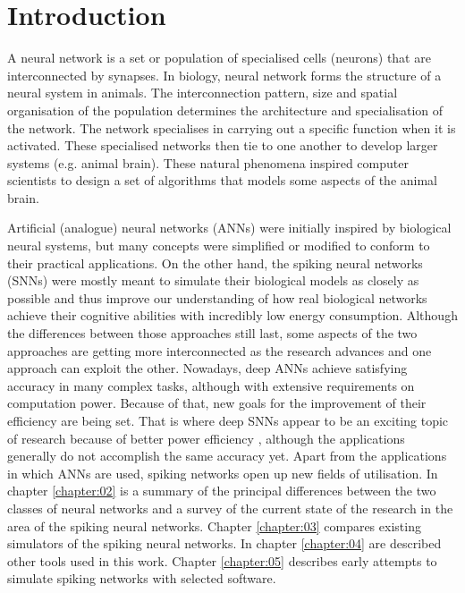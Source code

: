 \chapter{Introduction} \label{chapter:01}

A neural network is a set or population of specialised cells (neurons) that are interconnected by synapses. In biology, neural network forms the structure of a neural system in animals. The interconnection pattern, size and spatial organisation of the population determines the architecture and specialisation of the network. The network specialises in carrying out a specific function when it is activated. These specialised networks then tie to one another to develop larger systems (e.g. animal brain). These natural phenomena inspired computer scientists to design a set of algorithms that models some aspects of the animal brain. 

Artificial (analogue) neural networks (ANNs) were initially inspired by biological neural systems, but many concepts were simplified or modified to conform to their practical applications. On the other hand, the spiking neural networks (SNNs) were mostly meant to simulate their biological models as closely as possible and thus improve our understanding of how real biological networks achieve their cognitive abilities with incredibly low energy consumption. Although the differences between those approaches still last, some aspects of the two approaches are getting more interconnected as the research advances and one approach can exploit the other. Nowadays, deep ANNs achieve satisfying accuracy in many complex tasks, although with extensive requirements on computation power. Because of that, new goals for the improvement of their efficiency are being set. That is where deep SNNs appear to be an exciting topic of research because of better power efficiency \cite{caoSpikingDeepConvolutional2015, tavanaeiDeepLearningSpiking2019}, although the applications generally do not accomplish the same accuracy yet. Apart from the applications in which ANNs are used, spiking networks open up new fields of utilisation. In chapter \ref{chapter:02} is a summary of the principal differences between the two classes of neural networks and a survey of the current state of the research in the area of the spiking neural networks. Chapter \ref{chapter:03} compares existing simulators of the spiking neural networks. In chapter \ref{chapter:04} are described other tools used in this work. Chapter \ref{chapter:05} describes early attempts to simulate spiking networks with selected software.
